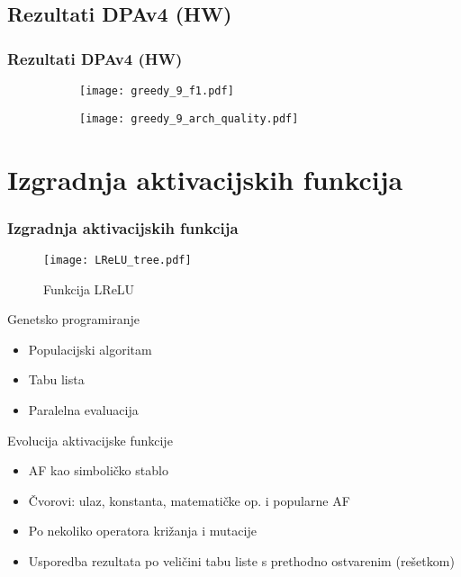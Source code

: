 \documentclass{beamer}
\begin{document}
\subsection{Rezultati DPAv4 (HW)}

\begin{frame}
\frametitle{Rezultati DPAv4 (HW)}

\begin{figure}
\centering
\begin{subfigure}{.48\textwidth}
  \centering
  \texttt{[image: greedy\_9\_f1.pdf]}
\end{subfigure}
\begin{subfigure}{.5\textwidth}
  \centering
  \texttt{[image: greedy\_9\_arch\_quality.pdf]}
\end{subfigure}
\end{figure}

\end{frame}

\section{Izgradnja aktivacijskih funkcija}

\begin{frame}
\frametitle{Izgradnja aktivacijskih funkcija}

\begin{wrapfigure}{r}{3cm}
  \texttt{[image: LReLU\_tree.pdf]}
  \caption{Funkcija LReLU}
\end{wrapfigure}

Genetsko programiranje

\begin{itemize}
\item Populacijski algoritam
\item Tabu lista
\item Paralelna evaluacija
\end{itemize}

Evolucija aktivacijske funkcije

\begin{itemize}
\item AF kao simboličko stablo
\item Čvorovi: ulaz, konstanta, matematičke op. i popularne AF
\item Po nekoliko operatora križanja i mutacije
\item Usporedba rezultata po veličini tabu liste s prethodno ostvarenim (rešetkom)
\end{itemize}

\end{frame}
\end{document}
